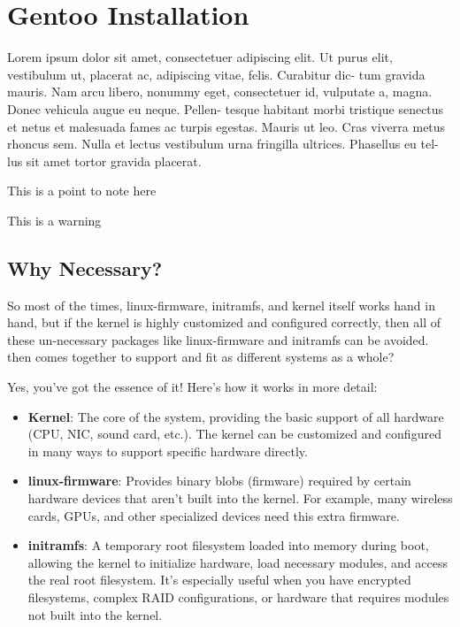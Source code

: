 \chapter{Gentoo Installation}

\begin{chapterdesc}
Lorem ipsum dolor sit amet, consectetuer adipiscing elit. Ut purus elit, vestibulum ut, placerat ac, adipiscing vitae, felis. Curabitur dic- tum gravida mauris. Nam arcu libero, nonummy eget, consectetuer id, vulputate a, magna. Donec vehicula augue eu neque. Pellen- tesque habitant morbi tristique senectus et netus et malesuada fames ac turpis egestas. Mauris ut leo. Cras viverra metus rhoncus sem. Nulla et lectus vestibulum urna fringilla ultrices. Phasellus eu tel- lus sit amet tortor gravida placerat.
\end{chapterdesc}

\begin{note}
  This is a point to note here
\end{note}
\begin{warning}
  This is a warning
\end{warning}

\section{Why Necessary?}
So most of the times, linux-firmware, initramfs, and kernel itself works hand in hand, but if the kernel is highly customized and configured correctly, then all of these un-necessary packages like linux-firmware and initramfs can be avoided. then comes together to support and fit as different systems as a whole?

Yes, you’ve got the essence of it! Here's how it works in more detail:

\begin{itemize}
    \item \textbf{Kernel}: The core of the system, providing the basic support of all hardware (CPU, NIC, sound card, etc.). The kernel can be customized and configured in many ways to support specific hardware directly.
    \item \textbf{linux-firmware}: Provides binary blobs (firmware) required by certain hardware devices that aren't built into the kernel. For example, many wireless cards, GPUs, and other specialized devices need this extra firmware.
    \item \textbf{initramfs}: A temporary root filesystem loaded into memory during boot, allowing the kernel to initialize hardware, load necessary modules, and access the real root filesystem. It’s especially useful when you have encrypted filesystems, complex RAID configurations, or hardware that requires modules not built into the kernel.
\end{itemize}

